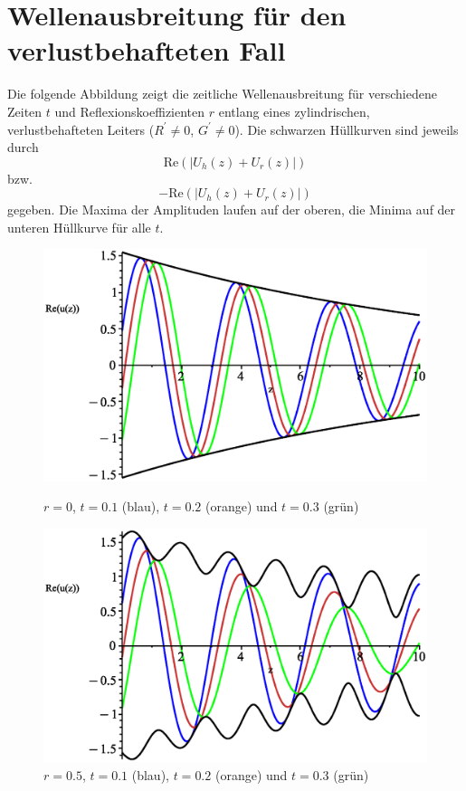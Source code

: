 \documentclass[paper=a4, parskip=half-, ngerman, fontsize=11pt]{scrreprt}
\begin{document}
\chapter{Wellenausbreitung für den verlustbehafteten Fall}
Die folgende Abbildung zeigt die zeitliche Wellenausbreitung für verschiedene Zeiten $t$ und Reflexionskoeffizienten
$r$ entlang eines zylindrischen, verlustbehafteten Leiters (\mbox{$R^{\prime} \neq 0$}, $G^{\prime} \neq 0$). Die
schwarzen
Hüllkurven sind jeweils durch \[
\mathrm{Re} ( \left| U_{h}(z) + U_{r}(z) \right| )
\] bzw. \[
- \mathrm{Re} ( \left| U_{h}(z) + U_{r}(z) \right| )
\] gegeben. Die Maxima der Amplituden laufen auf der oberen, die Minima auf der unteren Hüllkurve für alle $t$.
\begin{figure}[!htpb]
    \begin{minipage}{0.45\textwidth}
        \centering
        \includegraphics[width=\linewidth]{../graphics/Enveloppe/verlustbehaftet/R0}
        \caption*{$r=0$, $t=0.1$ (blau), $t=0.2$ (orange) und $t=0.3$ (grün)}
    \end{minipage}\hfill
    \begin{minipage}{0.45\textwidth}
        \centering
        \includegraphics[width=\linewidth]{../graphics/Enveloppe/verlustbehaftet/R0.5}
        \caption*{$r=0.5$, $t=0.1$ (blau), $t=0.2$ (orange) und $t=0.3$ (grün)}
    \end{minipage}


\end{figure}
\end{document}
